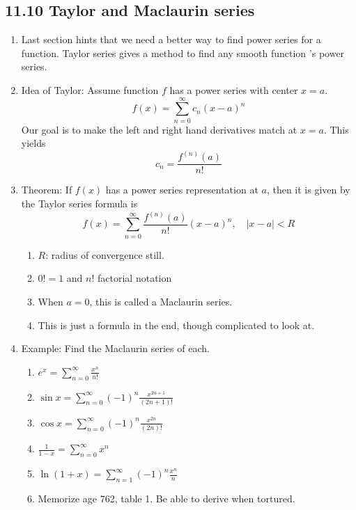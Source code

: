 \documentclass{article}
\newcommand{\ds}{\displaystyle}
\begin{document}
\subsection{11.10 Taylor and Maclaurin series}
\begin{enumerate}

\item Last section hints that we need a better way to find power series for a function. Taylor series gives a method to find any smooth function
's power series.

\item Idea of Taylor: Assume function $f$ has a power series with center $x=a$.
\[
f(x) = \sum_{n=0}^\infty c_n (x-a)^n
\]
Our goal is to make the left and right hand derivatives match at $x=a$. This yields 
\[
c_n = \frac{f^{(n)}(a)}{n!}
\]

\item Theorem: If $f(x)$ has a power series representation at $a$, then it is given by the Taylor series formula is
$$
f(x)  = \sum_{n=0}^\infty \frac{f^{(n)}(a)}{n!}(x-a)^n, \quad |x-a|<R
$$
\begin{enumerate}
\item $R$: radius of convergence still.
\item $0!=1$ and $n!$ factorial notation
\item When $a = 0$, this is called a Maclaurin series.
\item This is just a formula in the end, though complicated to look at.
\end{enumerate}

\item Example: Find the Maclaurin series of each.
\begin{enumerate}
\item $\ds e^x = \sum_{n=0}^\infty \frac{x^n}{n!}$
\item $\ds \sin x = \sum_{n=0}^\infty (-1)^n\frac{x^{2n+1}}{(2n+1)!}$
\item $\ds \cos x = \sum_{n=0}^\infty (-1)^n\frac{x^{2n}}{(2n)!}$
\item $\ds \frac{1}{1-x} = \sum_{n=0}^\infty x^n$
\item $\ds \ln(1+x) = \sum_{n=1}^\infty(-1)^n\frac{x^n}{n}$
\item Memorize age 762, table 1. Be able to derive when tortured.
\end{enumerate}


\end{enumerate}
\end{document}
